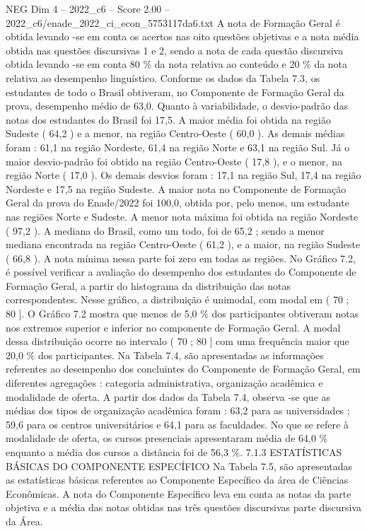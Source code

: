\begin{textsample}{NEG Dim 4 – 2022\_c6 – Score 2.00 – 2022\_c6/enade\_2022\_ci\_econ\_5753117da6.txt}
A nota de Formação Geral é obtida levando -se em conta os acertos nas oito questões objetivas e a nota média obtida nas questões discursivas 1 e 2, sendo a nota de cada questão discursiva obtida levando -se em conta 80 \% da nota relativa ao conteúdo e 20 \% da nota relativa ao desempenho linguístico.
Conforme os dados da Tabela 7.3, os estudantes de todo o Brasil obtiveram, no Componente de Formação Geral da prova, desempenho médio de 63,0.
Quanto à variabilidade, o desvio-padrão das notas dos estudantes do Brasil foi 17,5.
A maior média foi obtida na região Sudeste ( 64,2 ) e a menor, na região Centro-Oeste ( 60,0 ).
As demais médias foram : 61,1 na região Nordeste, 61,4 na região Norte e 63,1 na região Sul.
Já o maior desvio-padrão foi obtido na região Centro-Oeste ( 17,8 ), e o menor, na região Norte ( 17,0 ).
Os demais desvios foram : 17,1 na região Sul, 17,4 na região Nordeste e 17,5 na região Sudeste.
A maior nota no Componente de Formação Geral da prova do Enade/2022 foi 100,0, obtida por, pelo menos, um estudante nas regiões Norte e Sudeste.
A menor nota máxima foi obtida na região Nordeste ( 97,2 ).
A mediana do Brasil, como um todo, foi de 65,2 ; sendo a menor mediana encontrada na região Centro-Oeste ( 61,2 ), e a maior, na região Sudeste ( 66,8 ).
A nota mínima nessa parte foi zero em todas as regiões.
No Gráfico 7.2, é possível verificar a avaliação do desempenho dos estudantes do Componente de Formação Geral, a partir do histograma da distribuição das notas correspondentes.
Nesse gráfico, a distribuição é unimodal, com modal em ( 70 ; 80 ].
O Gráfico 7.2 mostra que menos de 5,0 \% dos participantes obtiveram notas nos extremos superior e inferior no componente de Formação Geral.
A modal dessa distribuição ocorre no intervalo ( 70 ; 80 ] com uma frequência maior que 20,0 \% dos participantes.
Na Tabela 7.4, são apresentadas as informações referentes ao desempenho dos concluintes do Componente de Formação Geral, em diferentes agregações : categoria administrativa, organização acadêmica e modalidade de oferta.
A partir dos dados da Tabela 7.4, observa -se que as médias dos tipos de organização acadêmica foram : 63,2 para as universidades ; 59,6 para os centros universitários e 64,1 para as faculdades.
No que se refere à modalidade de oferta, os cursos presenciais apresentaram média de 64,0 \% enquanto a média dos cursos a distância foi de 56,3 \%. 7.1.3 ESTATÍSTICAS BÁSICAS DO COMPONENTE ESPECÍFICO Na Tabela 7.5, são apresentadas as estatísticas básicas referentes ao Componente Específico da área de Ciências Econômicas.
A nota do Componente Específico leva em conta as notas da parte objetiva e a média das notas obtidas nas três questões discursivas parte discursiva da Área.

\end{textsample}
